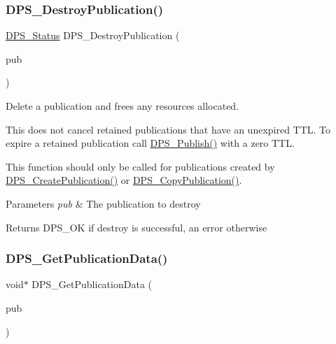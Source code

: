 \subsubsection{\texorpdfstring{D\+P\+S\+\_\+\+Destroy\+Publication()}{DPS\_DestroyPublication()}}
{\footnotesize\ttfamily \hyperlink{group__status_ga30395a84d3cad9d4ec29848106415038}{D\+P\+S\+\_\+\+Status} D\+P\+S\+\_\+\+Destroy\+Publication (\begin{DoxyParamCaption}\item[{\hyperlink{group__publication_ga0d439693474aa54e27f3d45a054696ac}{D\+P\+S\+\_\+\+Publication} $\ast$}]{pub }\end{DoxyParamCaption})}



Delete a publication and frees any resources allocated. 

This does not cancel retained publications that have an unexpired T\+TL. To expire a retained publication call \hyperlink{group__publication_ga828a4efc5c235c48a81f6460cc3fe416}{D\+P\+S\+\_\+\+Publish()} with a zero T\+TL.

This function should only be called for publications created by \hyperlink{group__publication_gaca070a96a6374e99a05d647c10737962}{D\+P\+S\+\_\+\+Create\+Publication()} or \hyperlink{group__publication_ga41f31a8b63558e13d73d96de6086e5c4}{D\+P\+S\+\_\+\+Copy\+Publication()}.


\begin{DoxyParams}{Parameters}
{\em pub} & The publication to destroy\\
\hline
\end{DoxyParams}
\begin{DoxyReturn}{Returns}
D\+P\+S\+\_\+\+OK if destroy is successful, an error otherwise 
\end{DoxyReturn}
\mbox{\label{group__publication_gaa8bee35089ac62289c9ba0e6a0568ca0}} 
\subsubsection{\texorpdfstring{D\+P\+S\+\_\+\+Get\+Publication\+Data()}{DPS\_GetPublicationData()}}
{\footnotesize\ttfamily void$\ast$ D\+P\+S\+\_\+\+Get\+Publication\+Data (\begin{DoxyParamCaption}\item[{const \hyperlink{group__publication_ga0d439693474aa54e27f3d45a054696ac}{D\+P\+S\+\_\+\+Publication} $\ast$}]{pub }\end{DoxyParamCaption})}



